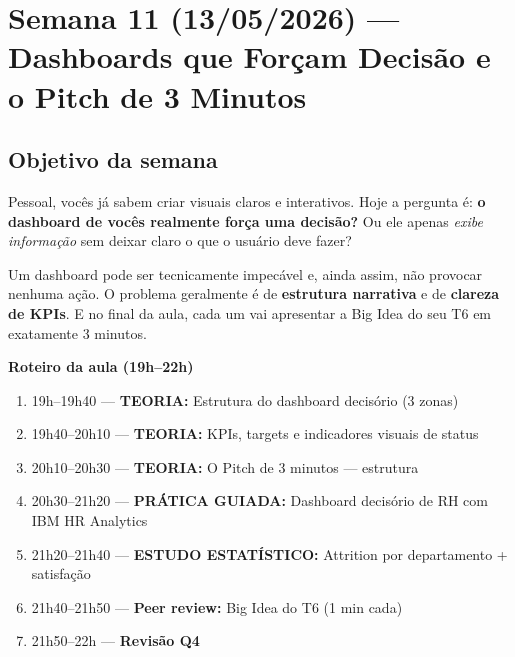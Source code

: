 
\chapter{Semana 11 (13/05/2026) — Dashboards que Forçam Decisão e o Pitch de 3 Minutos}

\section{Objetivo da semana}

Pessoal, vocês já sabem criar visuais claros e interativos. Hoje a pergunta é:
\textbf{o dashboard de vocês realmente força uma decisão?} Ou ele apenas
\emph{exibe informação} sem deixar claro o que o usuário deve fazer?

Um dashboard pode ser tecnicamente impecável e, ainda assim, não provocar
nenhuma ação. O problema geralmente é de \textbf{estrutura narrativa} e
de \textbf{clareza de KPIs}. E no final da aula, cada um vai apresentar
a Big Idea do seu T6 em exatamente 3 minutos.

\begin{BoardBox}
\textbf{Roteiro da aula (19h–22h)}
\begin{enumerate}
  \item 19h–19h40 — \textbf{TEORIA:} Estrutura do dashboard decisório (3 zonas)
  \item 19h40–20h10 — \textbf{TEORIA:} KPIs, targets e indicadores visuais de status
  \item 20h10–20h30 — \textbf{TEORIA:} O Pitch de 3 minutos — estrutura
  \item 20h30–21h20 — \textbf{PRÁTICA GUIADA:} Dashboard decisório de RH com IBM HR Analytics
  \item 21h20–21h40 — \textbf{ESTUDO ESTATÍSTICO:} Attrition por departamento + satisfação
  \item 21h40–21h50 — \textbf{Peer review:} Big Idea do T6 (1 min cada)
  \item 21h50–22h — \textbf{Revisão Q4}
\end{enumerate}
\end{BoardBox}

